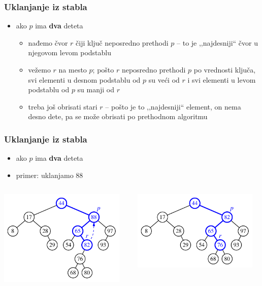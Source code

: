 \documentclass[compress,aspectratio=169]{beamer}
\begin{document}
\begin{frame}[fragile]
  \frametitle{Uklanjanje iz stabla}
  \begin{itemize}
    \item ako $p$ ima \textbf{dva} deteta
    \begin{itemize}
      \item nađemo čvor $r$ čiji ključ neposredno prethodi $p$ -- to je ,,najdesniji`` čvor u njegovom levom podstablu
      \item vežemo $r$ na mesto $p$; pošto $r$ neposredno prethodi $p$ po vrednosti ključa, svi elementi u desnom podstablu od $p$ su veći od $r$ i svi elementi u levom podstablu od $p$ su manji od $r$
      \item treba još obrisati stari $r$ -- pošto je to ,,najdesniji`` element, on nema desno dete, pa se može obrisati po prethodnom algoritmu
    \end{itemize}
  \end{itemize}
\end{frame}

\begin{frame}[fragile]
  \frametitle{Uklanjanje iz stabla}
  \begin{itemize}
    \item ako $p$ ima \textbf{dva} deteta
    \item primer: uklanjamo 88
  \end{itemize}
  \begin{columns}
    \begin{column}[c]{6cm}
      \begin{center}
        \includegraphics[width=6cm]{asp-11-pic07a.pdf}
      \end{center}
    \end{column}  
    \begin{column}[c]{6cm}
      \begin{center}
        \includegraphics[width=6cm]{asp-11-pic07b.pdf}
      \end{center}
    \end{column}  
  \end{columns}
\end{frame}
\end{document}
